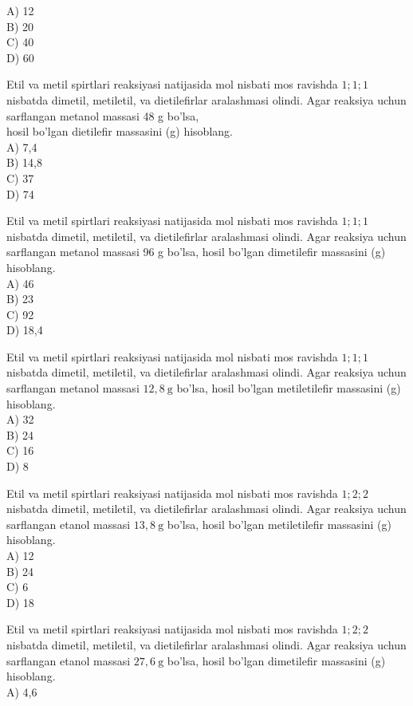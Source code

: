 A) 12\\
B) 20\\
C) 40\\
D) 60
  \item Etil va metil spirtlari reaksiyasi natijasida mol nisbati mos ravishda $1 ; 1 ; 1$ nisbatda dimetil, metiletil, va dietilefirlar aralashmasi olindi. Agar reaksiya uchun sarflangan metanol massasi 48 g bo'lsa,\\
hosil bo'lgan dietilefir massasini (g) hisoblang.\\
A) 7,4\\
B) 14,8\\
C) 37\\
D) 74
  \item Etil va metil spirtlari reaksiyasi natijasida mol nisbati mos ravishda $1 ; 1 ; 1$ nisbatda dimetil, metiletil, va dietilefirlar aralashmasi olindi. Agar reaksiya uchun sarflangan metanol massasi 96 g bo'lsa, hosil bo'lgan dimetilefir massasini (g) hisoblang.\\
A) 46\\
B) 23\\
C) 92\\
D) 18,4
  \item Etil va metil spirtlari reaksiyasi natijasida mol nisbati mos ravishda $1 ; 1 ; 1$ nisbatda dimetil, metiletil, va dietilefirlar aralashmasi olindi. Agar reaksiya uchun sarflangan metanol massasi $12,8 \mathrm{~g}$ bo'lsa, hosil bo'lgan metiletilefir massasini (g) hisoblang.\\
A) 32\\
B) 24\\
C) 16\\
D) 8
  \item Etil va metil spirtlari reaksiyasi natijasida mol nisbati mos ravishda $1 ; 2 ; 2$ nisbatda dimetil, metiletil, va dietilefirlar aralashmasi olindi. Agar reaksiya uchun sarflangan etanol massasi $13,8 \mathrm{~g}$ bo'lsa, hosil bo'lgan metiletilefir massasini (g) hisoblang.\\
A) 12\\
B) 24\\
C) 6\\
D) 18
  \item Etil va metil spirtlari reaksiyasi natijasida mol nisbati mos ravishda $1 ; 2 ; 2$ nisbatda dimetil, metiletil, va dietilefirlar aralashmasi olindi. Agar reaksiya uchun sarflangan etanol massasi $27,6 \mathrm{~g}$ bo'lsa, hosil bo'lgan dimetilefir massasini (g) hisoblang.\\
A) 4,6\\
